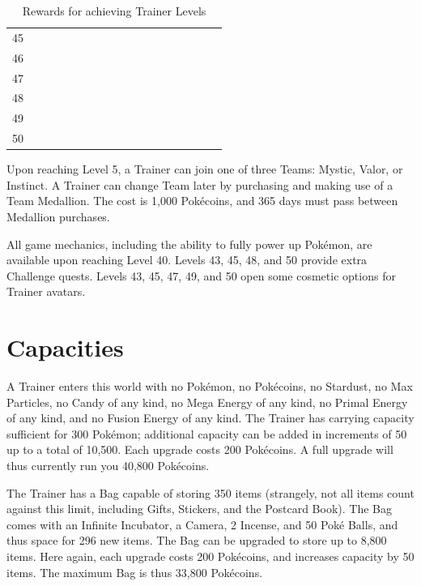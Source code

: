 \begin{table}[t]
\begin{center}
\begin{tabular}{l g c g c g c g c g c g c g c g c g}
   45 &    & & &    &    & & & &   &    &    &    & &   &   &   & \\
   46 &    & & &    &    & & & &   &    &    &    & &   &   &   & \\
   47 &    & & &    &    & & & &   &    &    &    & &   &   &   & \\
   48 &    & & &    &    & & & &   &    &    &    & &   &   &   & \\
   49 &    & & &    &    & & & &   &    &    &    & &   &   &   & \\
   50 &    & & &    &    & & & &   &    &    &    & &   &   &   & \\
\end{tabular}
\caption{Rewards for achieving Trainer Levels}
\label{table:levelitems}
\end{center}
\end{table}

Upon reaching Level 5, a Trainer can join one of three Teams: Mystic, Valor, or Instinct.
A Trainer can change Team later by purchasing and making use of a Team Medallion.
The cost is 1,000 Pokécoins, and 365 days must pass between Medallion purchases.

All game mechanics, including the ability to fully power up Pokémon,
 are available upon reaching Level 40.
Levels 43, 45, 48, and 50 provide extra Challenge quests.
Levels 43, 45, 47, 49, and 50 open some cosmetic options for Trainer avatars.

\section{Capacities}
A Trainer enters this world with no Pokémon, no Pokécoins, no Stardust,
  no Max Particles, no Candy of any kind, no Mega Energy of any kind,
  no Primal Energy of any kind, and no Fusion Energy of any kind.
The Trainer has carrying capacity sufficient for 300 Pokémon; additional
  capacity can be added in increments of 50 up to a total of 10,500.
Each upgrade costs 200 Pokécoins.
A full upgrade will thus currently run you 40,800 Pokécoins.

The Trainer has a Bag capable of storing 350 items (strangely, not all items
  count against this limit, including Gifts, Stickers, and the Postcard Book).
The Bag comes with an Infinite Incubator, a Camera, 2 Incense, and 50 Poké Balls,
  and thus space for 296 new items.
The Bag can be upgraded to store up to 8,800 items.
Here again, each upgrade costs 200 Pokécoins, and increases capacity by 50 items.
The maximum Bag is thus 33,800 Pokécoins.

